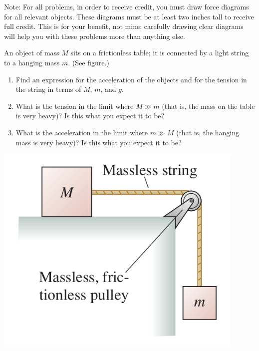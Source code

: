 \documentclass[12pt]{article}
\begin{document}
\Large
\centerline{}
\normalsize
\centerline{}

{\sc Note:} For all problems, in order to receive credit, you must draw force diagrams for all relevant objects. These diagrams must be at least two inches tall to receive full credit.
This is for your benefit, not mine; carefully drawing clear diagrams will help you with these problems more than anything else.

\bigskip


\begin{enumerate}


  \begin{minipage}{0.7\textwidth}
\item  An object of mass $M$ sits on a frictionless table; it is connected by
   a light string to a hanging mass $m$. (See figure.)
\begin{enumerate}
\item Find an expression for the acceleration of the objects and for the tension in the string in terms of $M$, $m$, and $g$.
\item What is the tension in the limit where $M \gg m$ (that is, the mass on the table is very heavy)? Is this what you expect it to be?
\item What is the acceleration in the limit where $m \gg M$ (that is, the hanging mass is very heavy)? Is this what you expect it to be?
\end{enumerate}
  \end{minipage}
  \begin{minipage}{0.3\textwidth}
\centerline{\includegraphics[width=0.9\textwidth]{problem736.png}}
  \end{minipage}


\end{enumerate}
\end{document}
